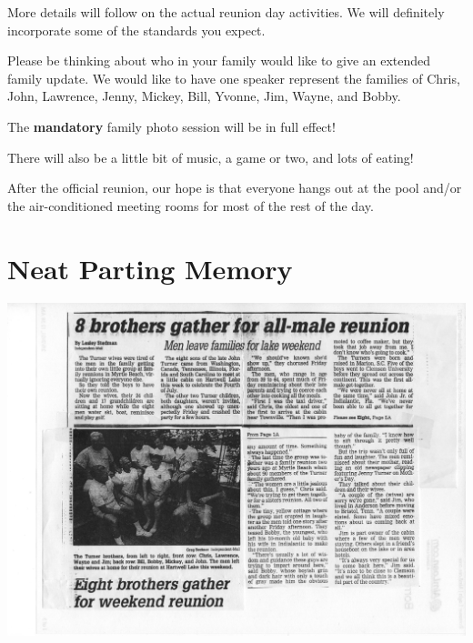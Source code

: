 \documentclass[
]{book}
\begin{document}
More details will follow on the actual reunion day activities. We will definitely incorporate some of the standards you expect.

Please be thinking about who in your family would like to give an extended family update. We would like to have one speaker represent the families of Chris, John, Lawrence, Jenny, Mickey, Bill, Yvonne, Jim, Wayne, and Bobby.

The \textbf{mandatory} family photo session will be in full effect!

There will also be a little bit of music, a game or two, and lots of eating!

After the official reunion, our hope is that everyone hangs out at the pool and/or the air-conditioned meeting rooms for most of the rest of the day.

\hypertarget{neat-parting-memory}{%
\section*{Neat Parting Memory}\label{neat-parting-memory}}

\includegraphics[width=1\linewidth]{images/brothers}
\end{document}

